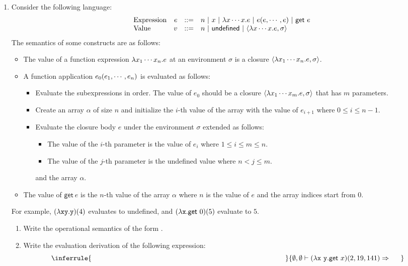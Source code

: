 \begin{enumerate}
\item Consider the following language:
\[
  \begin{array}{lrrl}
  \text{Expression}& e & ::= & n\ |\ x\ |\ \efun{x\cdots x}{e}\ |\
  \eappfo{e}{e,\cdots,e}\ |\ \textsf{get}\ e \\
  \text{Value}& v & ::= & n\ |\ \textsf{undefined}\ |\ \clov{x\cdots x}{e}{\sigma} \\
  \end{array}
\]
The semantics of some constructs are as follows:
\begin{itemize}
  \item The value of a function expression $\lambda x_1\cdots x_n.e$
    at an environment $\sigma$ is a closure $\langle\lambda x_1\cdots x_n.e,\sigma\rangle$.
  \item A function application $e_0(e_1,\cdots,e_n)$ is evaluated as follows:
    \begin{itemize}
      \item Evaluate the subexpressions in order.
        The value of $e_0$ should be a closure
        $\langle\lambda x_1\cdots x_m.e,\sigma\rangle$
        that has $m$ parameters.
      \item Create an array $\alpha$ of size $n$ and
        initialize the $i$-th value of the array with the value of $e_{i+1}$
        where $0 \le i \le n-1$.
      \item Evaluate the closure body $e$ under the environment $\sigma$
        extended as follows:
        \begin{itemize}
          \item The value of the $i$-th parameter is the value of $e_i$
            where $1 \le i \le m \le n$.
          \item The value of the $j$-th parameter is the \textsf{undefined}
            value where $n < j \le m$.
        \end{itemize}
        and the array $\alpha$.
    \end{itemize}
  \item The value of $\textsf{get}\ e$ is the $n$-th value of the array $\alpha$
    where $n$ is the value of $e$ and the array indices start from $0$.
\end{itemize}

For example,
$(\lambda\texttt{x}\texttt{y}.\texttt{y})(4)$
evaluates to \textsf{undefined}, and
$(\lambda\texttt{x}.\textsf{get}\ 0)(5)$
evaluate to $5$.

\begin{enumerate}
  \item Write the operational semantics of the form
    .
  \item Write the evaluation derivation of the following expression:
  \[
    \inferrule
    {\hspace*{0.8\textwidth}}
    {\eval{\emptyset,\emptyset}{\eappfo{(\efun{\cx\ \cy}{\textsf{get}\ x})}{2,19,141}}{~~~~~}}
  \]
\end{enumerate}


\end{enumerate}
